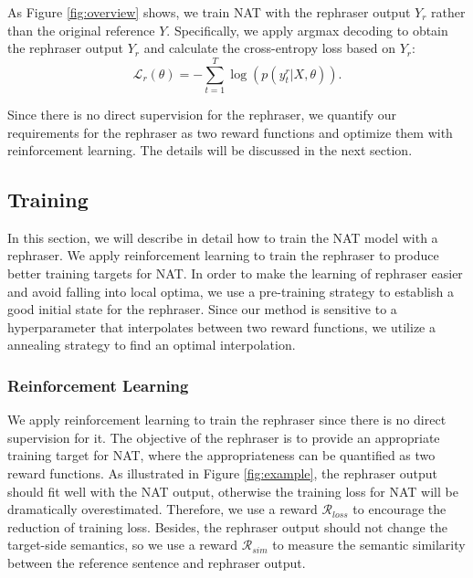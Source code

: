 \documentclass[letterpaper]{article} %
\begin{document}
As Figure \ref{fig:overview} shows, we train NAT with the rephraser output $Y_r$ rather than the original reference $Y$. Specifically, we apply argmax decoding to obtain the rephraser output $Y_r$ and calculate the cross-entropy loss based on $Y_r$:
\begin{equation}
\mathcal{L}_{r}(\theta) = -\sum_{t=1}^{T}\log(p(y_t^r|X,\theta)).
\end{equation}

Since there is no direct supervision for the rephraser, we quantify our requirements for the rephraser as two reward functions and optimize them with reinforcement learning. The details will be discussed in the next section.

\subsection{Training}
\label{sec:32}
In this section, we will describe in detail how to train the NAT model with a rephraser. We apply reinforcement learning to train the rephraser to produce better training targets for NAT. In order to make the learning of rephraser easier and avoid falling into local optima, we use a pre-training strategy to establish a good initial state for the rephraser. Since our method is sensitive to a hyperparameter that interpolates between two reward functions, we utilize a annealing strategy to find an optimal interpolation.

\subsubsection{Reinforcement Learning}
We apply reinforcement learning to train the rephraser since there is no direct supervision for it. The objective of the rephraser is to provide an appropriate training target for NAT, where the appropriateness can be quantified as two reward functions.
As illustrated in Figure \ref{fig:example}, the rephraser output should fit well with the NAT output, otherwise the training loss for NAT will be dramatically overestimated. Therefore, we use a reward $\mathcal{R}_{loss}$ to encourage the reduction of training loss. Besides, the rephraser output should not change the target-side semantics, so we use a reward $\mathcal{R}_{sim}$ to measure the semantic similarity between the reference sentence and rephraser output.
\end{document}
